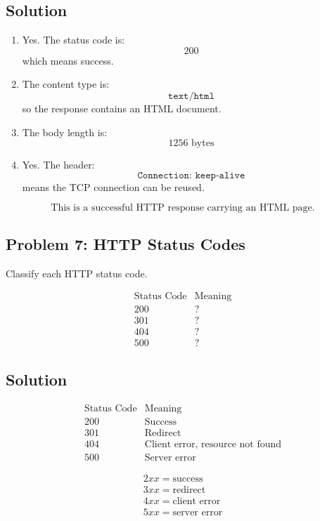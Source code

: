 \documentclass[12pt]{article}
\begin{document}
\subsection*{Solution}

\begin{enumerate}
    \item Yes. The status code is:
    \[
    200
    \]
    which means success.

    \item The content type is:
    \[
    \texttt{text/html}
    \]
    so the response contains an HTML document.

    \item The body length is:
    \[
    1256 \text{ bytes}
    \]

    \item Yes. The header:
    \[
    \texttt{Connection: keep-alive}
    \]
    means the TCP connection can be reused.
\end{enumerate}

\[
\boxed{\text{This is a successful HTTP response carrying an HTML page.}}
\]

\subsection*{Problem 7: HTTP Status Codes}
Classify each HTTP status code.

\[
\begin{array}{c|c}
\text{Status Code} & \text{Meaning} \\
\hline
200 & ? \\
301 & ? \\
404 & ? \\
500 & ?
\end{array}
\]

\subsection*{Solution}

\[
\begin{array}{c|c}
\text{Status Code} & \text{Meaning} \\
\hline
200 & \text{Success} \\
301 & \text{Redirect} \\
404 & \text{Client error, resource not found} \\
500 & \text{Server error}
\end{array}
\]

\[
\boxed{
\begin{array}{c}
2xx = \text{success} \\
3xx = \text{redirect} \\
4xx = \text{client error} \\
5xx = \text{server error}
\end{array}
}
\]
\end{document}
